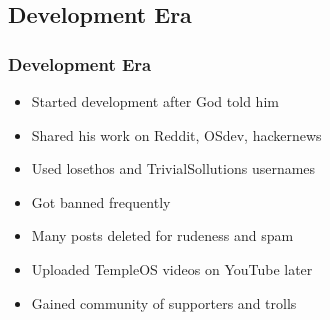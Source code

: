 \documentclass{beamer}
\begin{document}
	\subsection{Development Era}
	\begin{frame}
		\frametitle{Development Era}
		\begin{itemize}
			\item Started development after God told him

			\item Shared his work on Reddit, OSdev, hackernews

			\item Used losethos and TrivialSollutions usernames

			\item Got banned frequently

			\item Many posts deleted for rudeness and spam

			\item Uploaded TempleOS videos on YouTube later

			\item Gained community of supporters and trolls
		\end{itemize}
	\end{frame}
\end{document}
